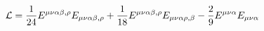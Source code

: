 \begin{equation}
{\cal L} = \frac{1}{24} E^{\mu\nu\alpha\beta,\rho}
E_{\mu\nu\alpha\beta,\rho} + \frac{1}{18} E^{\mu\nu\alpha\beta,\rho}
E_{\mu\nu\alpha\rho,\beta} - \frac{2}{9} E^{\mu\nu\alpha}
E_{\mu\nu\alpha}
\end{equation}


